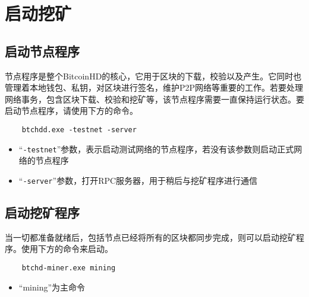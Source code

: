 \section{启动挖矿}
\subsection{启动节点程序}
\begin{flushleft}
    节点程序是整个BitcoinHD的核心，它用于区块的下载，校验以及产生。它同时也管理着本地钱包、私钥，对区块进行签名，维护P2P网络等重要的工作。若要处理网络事务，包含区块下载、校验和挖矿等，该节点程序需要一直保持运行状态。要启动节点程序，请使用下方的命令。
\end{flushleft}
\scriptsize
\begin{verbatim}
    btchdd.exe -testnet -server
\end{verbatim}
\normalsize
\begin{itemize}
    \item ``\texttt{-testnet}''参数，表示启动测试网络的节点程序，若没有该参数则启动正式网络的节点程序
    \item ``\texttt{-server}''参数，打开RPC服务器，用于稍后与挖矿程序进行通信
\end{itemize}
\subsection{启动挖矿程序}
\begin{flushleft}
    当一切都准备就绪后，包括节点已经将所有的区块都同步完成，则可以启动挖矿程序。使用下方的命令来启动。
\end{flushleft}
\scriptsize
\begin{verbatim}
    btchd-miner.exe mining
\end{verbatim}
\normalsize
\begin{itemize}
    \item ``mining''为主命令
\end{itemize}
